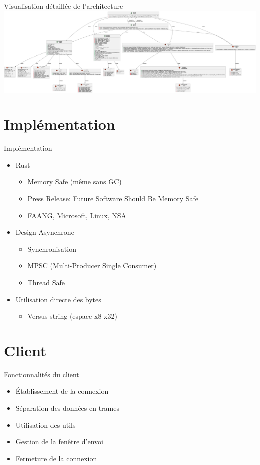 \documentclass{beamer}
\newlength\beamerleftmargin
\begin{document}
\begin{frame}{Visualisation détaillée de l'architecture}
	\hspace{-\beamerleftmargin}%
	\includegraphics[width=\paperwidth]{class-diagram.png}
\end{frame}

\section{Implémentation}
\begin{frame}{Implémentation}
	\begin{itemize}
		\item Rust
		      \begin{itemize}
			      \item Memory Safe (même sans GC)
			      \item Press Release: Future Software Should Be Memory Safe
			      \item FAANG, Microsoft, Linux, NSA
		      \end{itemize}
		\item Design Asynchrone
		      \begin{itemize}
			      \item Synchronisation
			      \item MPSC (Multi-Producer Single Consumer)
			      \item Thread Safe
		      \end{itemize}
		\item Utilisation directe des bytes
		      \begin{itemize}
			      \item Versus string (espace x8-x32)
		      \end{itemize}
	\end{itemize}
\end{frame}

\section{Client}
\begin{frame}{Fonctionnalités du client}
	\begin{itemize}
		\item Établissement de la connexion
		\item Séparation des données en trames
		\item Utilisation des utils
		\item Gestion de la fenêtre d'envoi
		\item Fermeture de la connexion
	\end{itemize}
\end{frame}
\end{document}
